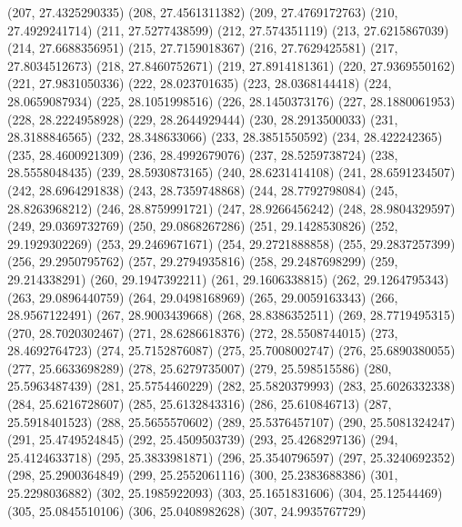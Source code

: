 {					(207, 27.4325290335)
					(208, 27.4561311382)
					(209, 27.4769172763)
					(210, 27.4929241714)
					(211, 27.5277438599)
					(212, 27.574351119)
					(213, 27.6215867039)
					(214, 27.6688356951)
					(215, 27.7159018367)
					(216, 27.7629425581)
					(217, 27.8034512673)
					(218, 27.8460752671)
					(219, 27.8914181361)
					(220, 27.9369550162)
					(221, 27.9831050336)
					(222, 28.023701635)
					(223, 28.0368144418)
					(224, 28.0659087934)
					(225, 28.1051998516)
					(226, 28.1450373176)
					(227, 28.1880061953)
					(228, 28.2224958928)
					(229, 28.2644929444)
					(230, 28.2913500033)
					(231, 28.3188846565)
					(232, 28.348633066)
					(233, 28.3851550592)
					(234, 28.422242365)
					(235, 28.4600921309)
					(236, 28.4992679076)
					(237, 28.5259738724)
					(238, 28.5558048435)
					(239, 28.5930873165)
					(240, 28.6231414108)
					(241, 28.6591234507)
					(242, 28.6964291838)
					(243, 28.7359748868)
					(244, 28.7792798084)
					(245, 28.8263968212)
					(246, 28.8759991721)
					(247, 28.9266456242)
					(248, 28.9804329597)
					(249, 29.0369732769)
					(250, 29.0868267286)
					(251, 29.1428530826)
					(252, 29.1929302269)
					(253, 29.2469671671)
					(254, 29.2721888858)
					(255, 29.2837257399)
					(256, 29.2950795762)
					(257, 29.2794935816)
					(258, 29.2487698299)
					(259, 29.214338291)
					(260, 29.1947392211)
					(261, 29.1606338815)
					(262, 29.1264795343)
					(263, 29.0896440759)
					(264, 29.0498168969)
					(265, 29.0059163343)
					(266, 28.9567122491)
					(267, 28.9003439668)
					(268, 28.8386352511)
					(269, 28.7719495315)
					(270, 28.7020302467)
					(271, 28.6286618376)
					(272, 28.5508744015)
					(273, 28.4692764723)
					(274, 25.7152876087)
					(275, 25.7008002747)
					(276, 25.6890380055)
					(277, 25.6633698289)
					(278, 25.6279735007)
					(279, 25.598515586)
					(280, 25.5963487439)
					(281, 25.5754460229)
					(282, 25.5820379993)
					(283, 25.6026332338)
					(284, 25.6216728607)
					(285, 25.6132843316)
					(286, 25.610846713)
					(287, 25.5918401523)
					(288, 25.5655570602)
					(289, 25.5376457107)
					(290, 25.5081324247)
					(291, 25.4749524845)
					(292, 25.4509503739)
					(293, 25.4268297136)
					(294, 25.4124633718)
					(295, 25.3833981871)
					(296, 25.3540796597)
					(297, 25.3240692352)
					(298, 25.2900364849)
					(299, 25.2552061116)
					(300, 25.2383688386)
					(301, 25.2298036882)
					(302, 25.1985922093)
					(303, 25.1651831606)
					(304, 25.12544469)
					(305, 25.0845510106)
					(306, 25.0408982628)
					(307, 24.9935767729)
}
